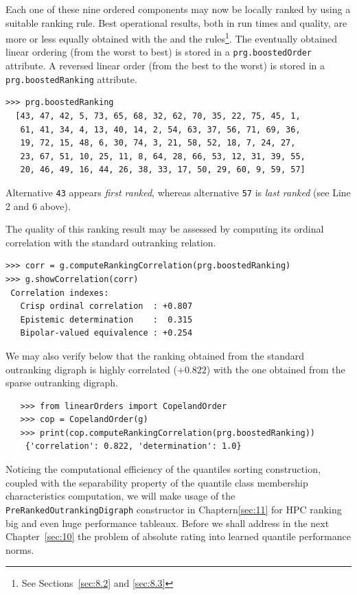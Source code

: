 Each one of these nine ordered components may now be locally ranked by using a suitable ranking rule. Best operational results, both in run times and quality, are more or less equally obtained with the \Copeland and the \NetFlows rules\footnote{See Sections~\ref{sec:8.2} and \ref{sec:8.3}}. The eventually obtained linear ordering (from the worst to best) is stored in a \texttt{prg.boostedOrder} attribute. A reversed linear order (from the best to the worst) is stored in a \texttt{prg.boostedRanking} attribute.
  \begin{lstlisting}
>>> prg.boostedRanking
  [43, 47, 42, 5, 73, 65, 68, 32, 62, 70, 35, 22, 75, 45, 1,
   61, 41, 34, 4, 13, 40, 14, 2, 54, 63, 37, 56, 71, 69, 36,
   19, 72, 15, 48, 6, 30, 74, 3, 21, 58, 52, 18, 7, 24, 27,
   23, 67, 51, 10, 25, 11, 8, 64, 28, 66, 53, 12, 31, 39, 55,
   20, 46, 49, 16, 44, 26, 38, 33, 17, 50, 29, 60, 9, 59, 57]
\end{lstlisting}
Alternative \texttt{43} appears \emph{first ranked}, whereas alternative \texttt{57} is \emph{last ranked} (see Line 2 and 6 above).

The quality of this ranking result may be assessed by computing its ordinal correlation with the standard outranking relation.  
\begin{lstlisting}
>>> corr = g.computeRankingCorrelation(prg.boostedRanking)
>>> g.showCorrelation(corr)
 Correlation indexes:
   Crisp ordinal correlation  : +0.807
   Epistemic determination    :  0.315
   Bipolar-valued equivalence : +0.254
\end{lstlisting}

We may also verify below that the \Copeland ranking obtained from the standard outranking digraph is highly correlated ($+0.822$) with the one obtained from the sparse outranking digraph.
\begin{lstlisting}
   >>> from linearOrders import CopelandOrder
   >>> cop = CopelandOrder(g)
   >>> print(cop.computeRankingCorrelation(prg.boostedRanking))
    {'correlation': 0.822, 'determination': 1.0}
\end{lstlisting}

\vspace{1cm}
Noticing the computational efficiency of the quantiles sorting construction, coupled with the separability property of the quantile class membership characteristics computation, we will make usage of the \texttt{PreRankedOutrankingDigraph} constructor in Chaptern\ref{sec:11} for HPC ranking big and even huge performance tableaux. Before we shall address in the next Chapter~\ref{sec:10} the problem of absolute rating into learned quantile performance norms.

\clearpage


%
 
